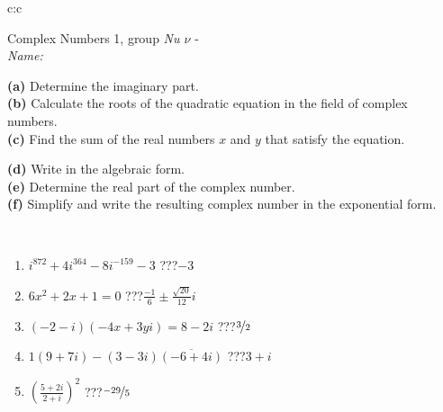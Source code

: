 \documentclass[10pt]{report}
\begin{document}
\begin{tabular}{c:c}
\begin{minipage}[c][104.5mm][t]{0.5\linewidth}
\begin{center}
\vspace{5mm}
{\huge Complex Numbers 1, group \textit{Nu $\nu$} -}\\[5mm]
\textit{Name:}\phantom{xxxxxxxxxxxxxxxxxxxxxxxxxxxxxxxxxxxxxxxxxxxxxxxxxxxxxxxxxxxxxxxxx}\\[5mm]
\begin{minipage}{0.95\linewidth}
\begin{center}
{\small \begin{minipage}{0.44\textwidth} \raggedright
\textbf{(a)} Determine the imaginary part. \\[1mm]
\textbf{(b)} Calculate the roots of the quadratic equation in the field of complex numbers. \\[1mm]
\textbf{(c)} Find the sum of the real numbers \(x\) and \(y\) that satisfy the equation. \end{minipage} \begin{minipage}{0.54\textwidth}
\textbf{(d)} Write in the algebraic form. \\[1mm]
\textbf{(e)} Determine the real part of the complex number. \\[1mm]
\textbf{(f)} Simplify and write the resulting complex number in the exponential form.
\end{minipage}
} \vspace{3mm}
\end{center}
\end{minipage}
\\[1mm]
\begin{minipage}{0.79\linewidth}
\begin{center}
\begin{varwidth}{\linewidth}
\setlength{\itemsep}{0pt}
\begin{enumerate}
\large
\item $i^{872}+4i^{364}-8i^{-159}-3$\quad \dotfill\; ???\;\dotfill \quad $-3$
\item $6x^2+2x+1=0$\quad \dotfill\; ???\;\dotfill \quad $\frac{-1}{6} \pm{}\frac{ \sqrt{20}}{12}i$
\item $(-2-i)(-4x+3yi)=8-2i$\quad \dotfill\; ???\;\dotfill \quad $\nicefrac{3}{2}$
\item $1(9+7i)-(3-3i)\overline{(-6+4i)}$\quad \dotfill\; ???\;\dotfill \quad $3+i$
\item $\left(\frac{5+2i}{2+i}\right)^2$\quad \dotfill\; ???\;\dotfill \quad $\nicefrac{-29}{5}$

\end{enumerate}
\end{varwidth}
\end{center}
\end{minipage}
\end{center}
\end{minipage}
\end{tabular}
\end{document}
